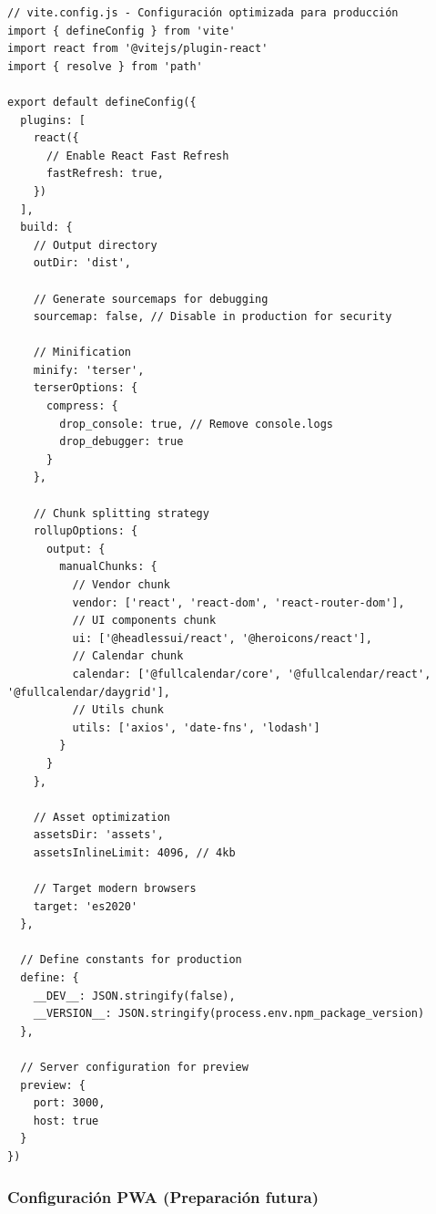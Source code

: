 \documentclass[12pt,a4paper,oneside]{report}
\begin{document}
\begin{lstlisting}
// vite.config.js - Configuración optimizada para producción
import { defineConfig } from 'vite'
import react from '@vitejs/plugin-react'
import { resolve } from 'path'

export default defineConfig({
  plugins: [
    react({
      // Enable React Fast Refresh
      fastRefresh: true,
    })
  ],
  build: {
    // Output directory
    outDir: 'dist',
    
    // Generate sourcemaps for debugging
    sourcemap: false, // Disable in production for security
    
    // Minification
    minify: 'terser',
    terserOptions: {
      compress: {
        drop_console: true, // Remove console.logs
        drop_debugger: true
      }
    },
    
    // Chunk splitting strategy
    rollupOptions: {
      output: {
        manualChunks: {
          // Vendor chunk
          vendor: ['react', 'react-dom', 'react-router-dom'],
          // UI components chunk
          ui: ['@headlessui/react', '@heroicons/react'],
          // Calendar chunk
          calendar: ['@fullcalendar/core', '@fullcalendar/react', '@fullcalendar/daygrid'],
          // Utils chunk
          utils: ['axios', 'date-fns', 'lodash']
        }
      }
    },
    
    // Asset optimization
    assetsDir: 'assets',
    assetsInlineLimit: 4096, // 4kb
    
    // Target modern browsers
    target: 'es2020'
  },
  
  // Define constants for production
  define: {
    __DEV__: JSON.stringify(false),
    __VERSION__: JSON.stringify(process.env.npm_package_version)
  },
  
  // Server configuration for preview
  preview: {
    port: 3000,
    host: true
  }
})
\end{lstlisting}

\subsubsection{Configuración PWA (Preparación
futura)}\label{configuraciuxf3n-pwa-preparaciuxf3n-futura}
\end{document}
